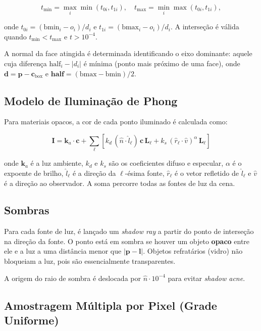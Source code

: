 \documentclass[12pt,a4paper]{article}
\begin{document}
\[
  t_{\min} = \max_i\!\min(t_{0i}, t_{1i}),
  \quad
  t_{\max} = \min_i\!\max(t_{0i}, t_{1i}),
\]

onde $t_{0i} = (\text{bmin}_i - o_i)/d_i$ e
$t_{1i} = (\text{bmax}_i - o_i)/d_i$.
A interseção é válida quando $t_{\min} < t_{\max}$ e $t > 10^{-4}$.

A normal da face atingida é determinada identificando o eixo dominante:
aquele cuja diferença $\text{half}_i - |d_i|$ é mínima (ponto mais
próximo de uma face), onde $\mathbf{d} = \mathbf{p} - \mathbf{c}_{\text{box}}$
e $\mathbf{half} = (\text{bmax} - \text{bmin})/2$.

\subsection{Modelo de Iluminação de Phong}

Para materiais opacos, a cor de cada ponto iluminado é calculada como:

\[
  \mathbf{I} = \mathbf{k}_a \cdot \mathbf{c}
  + \sum_{\ell} \left[
      k_d\,(\hat{n}\cdot\hat{l}_\ell)\,\mathbf{c}\,\mathbf{L}_\ell
    + k_s\,(\hat{r}_\ell\cdot\hat{v})^{\alpha}\,\mathbf{L}_\ell
  \right]
\]

onde $\mathbf{k}_a$ é a luz ambiente, $k_d$ e $k_s$ são os coeficientes
difuso e especular, $\alpha$ é o expoente de brilho, $\hat{l}_\ell$ é a
direção da $\ell$-ésima fonte, $\hat{r}_\ell$ é o vetor refletido de
$\hat{l}_\ell$ e $\hat{v}$ é a direção ao observador. A soma percorre
todas as fontes de luz da cena.

\subsection{Sombras}

Para cada fonte de luz, é lançado um \textit{shadow ray} a partir do
ponto de interseção na direção da fonte. O ponto está em sombra se
houver um objeto \textbf{opaco} entre ele e a luz a uma distância menor
que $|\mathbf{p} - \mathbf{l}|$. Objetos refratários (vidro) não
bloqueiam a luz, pois são essencialmente transparentes.

A origem do raio de sombra é deslocada por $\hat{n} \cdot 10^{-4}$ para
evitar \textit{shadow acne}.

\subsection{Amostragem Múltipla por Pixel (Grade Uniforme)}
\end{document}
